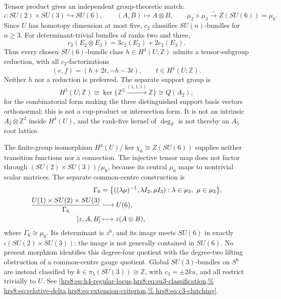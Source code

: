 \begin{enumerate}[leftmargin=1.8em]
Tensor product gives an independent group-theoretic match:
\[
 \iota:SU(2)\times SU(3)\hookrightarrow SU(6),\qquad
 (A,B)\longmapsto A\otimes B,
 \qquad
 \mu_2\times\mu_3\xrightarrow{\sim}Z(SU(6))=\mu_6.
\]
Since \(U\) has homotopy dimension at most five, \(c_2\) classifies
\(SU(n)\)-bundles for \(n\ge3\).  For determinant-trivial bundles of ranks
two and three,
\[
 c_2(E_2\otimes E_3)=3c_2(E_2)+2c_2(E_3).
\]
Thus every chosen \(SU(6)\)-bundle class
\(h\in H^4(U;\mathbb Z)\) admits a tensor-subgroup reduction, with all
\(c_2\)-factorizations
\[
 (e,f)=(h+2t,-h-3t),\qquad t\in H^4(U;\mathbb Z).
\]
Neither \(h\) nor a reduction is preferred.  The separate support group is
\[
 H^5(U;\mathbb Z)
 \cong\ker\{\mathbb Z^3\xrightarrow{(1,1,1)}\mathbb Z\}
 \cong Q(A_2),
\]
for the combinatorial form making the three distinguished support basis
vectors orthonormal; this is not a cup-product or intersection form.  It is
not an intrinsic \(A_2\otimes\mathbb Z^2\) inside \(H^4(U)\), and the
rank-five kernel of \(\deg_F\) is not thereby an \(A_5\) root lattice.

The finite-group isomorphism
\(H^4(U)/\ker\chi_6\cong Z(SU(6))\) supplies neither transition functions
nor a connection.  The injective tensor map does not factor through
\((SU(2)\times SU(3))/\mu_6\), because its central \(\mu_6\) maps to
nontrivial scalar matrices.  The separate common-centre construction is
\[
\begin{aligned}
 \Gamma_6
 &=\bigl\{((\lambda\mu)^{-1},\lambda I_2,\mu I_3):
             \lambda\in\mu_2,\ \mu\in\mu_3\bigr\},\\
 \frac{U(1)\times SU(2)\times SU(3)}{\Gamma_6}
 &\lhook\joinrel\longrightarrow U(6),\\
 [z,A,B]&\longmapsto z(A\otimes B),
\end{aligned}
\]
where \(\Gamma_6\cong\mu_6\).  Its determinant is \(z^6\), and its image
meets \(SU(6)\) in exactly \(\iota(SU(2)\times SU(3))\); the image is not
generally contained in \(SU(6)\).  No present morphism identifies this degree-four quotient
with the degree-two lifting obstruction of a common-centre gauge quotient.
Global \(SU(3)\)-bundles on \(S^6\) are instead classified by
\(k\in\pi_5(SU(3))\cong\mathbb Z\), with \(c_3=\pm2ku\), and all restrict
trivially to \(U\).  See
\cref{hrs8:eq:h4-regular-locus,hrs8:eq:su3-classification,%
hrs8:eq:relative-delta,hrs8:eq:extension-criterion,%
hrs8:eq:c3-clutching}.


\end{enumerate}
